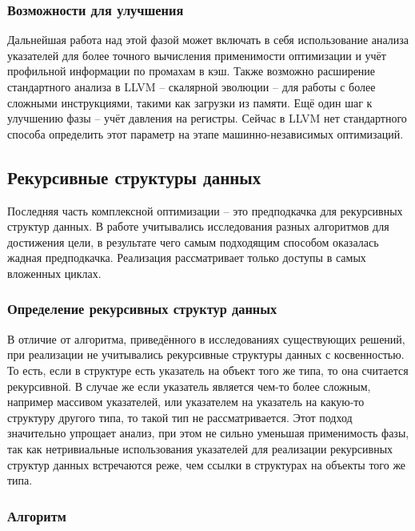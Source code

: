 \documentclass[12pt,a4paper]{article}
\begin{document}
\subsubsection{Возможности для улучшения}

\indent

Дальнейшая работа над этой фазой может включать в себя использование анализа указателей для более точного вычисления применимости оптимизации и учёт профильной информации по промахам в кэш. Также возможно расширение стандартного анализа в LLVM -- скалярной эволюции -- для работы с более сложными инструкциями, такими как загрузки из памяти. Ещё один шаг к улучшению фазы -- учёт давления на регистры. Сейчас в LLVM нет стандартного способа определить этот параметр на этапе машинно-независимых оптимизаций.

\subsection{Рекурсивные структуры данных}

\indent

Последняя часть комплексной оптимизации -- это предподкачка для рекурсивных структур данных. В работе учитывались исследования разных алгоритмов для достижения цели, в результате чего самым подходящим способом оказалась жадная предподкачка. Реализация рассматривает только доступы в самых вложенных циклах.

\subsubsection{Определение рекурсивных структур данных}

\indent

В отличие от алгоритма, приведённого в исследованиях существующих решений, при реализации не учитывались рекурсивные структуры данных с косвенностью. То есть, если в структуре есть указатель на объект того же типа, то она считается рекурсивной. В случае же если указатель является чем-то более сложным, например массивом указателей, или указателем на указатель на какую-то структуру другого типа, то такой тип не рассматривается. Этот подход значительно упрощает анализ, при этом не сильно уменьшая применимость фазы, так как нетривиальные использования указателей для реализации рекурсивных структур данных встречаются реже, чем ссылки в структурах на объекты того же типа.

\subsubsection{Алгоритм}
\end{document}
